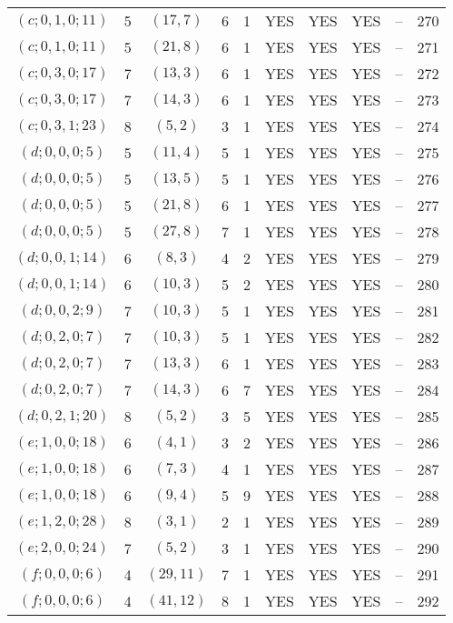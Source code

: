 \begin{longtable}{|c|c|c|c|c|c|c|c|c|c|}
$(c; 0, 1, 0; 11)$ & 5 & $(17, 7)$ & 6 & 1 & YES & YES & YES & -- & 270\\
$(c; 0, 1, 0; 11)$ & 5 & $(21, 8)$ & 6 & 1 & YES & YES & YES & -- & 271\\
$(c; 0, 3, 0; 17)$ & 7 & $(13, 3)$ & 6 & 1 & YES & YES & YES & -- & 272\\
$(c; 0, 3, 0; 17)$ & 7 & $(14, 3)$ & 6 & 1 & YES & YES & YES & -- & 273\\
$(c; 0, 3, 1; 23)$ & 8 & $(5, 2)$ & 3 & 1 & YES & YES & YES & -- & 274\\
$(d; 0, 0, 0; 5)$ & 5 & $(11, 4)$ & 5 & 1 & YES & YES & YES & -- & 275\\
$(d; 0, 0, 0; 5)$ & 5 & $(13, 5)$ & 5 & 1 & YES & YES & YES & -- & 276\\
$(d; 0, 0, 0; 5)$ & 5 & $(21, 8)$ & 6 & 1 & YES & YES & YES & -- & 277\\
$(d; 0, 0, 0; 5)$ & 5 & $(27, 8)$ & 7 & 1 & YES & YES & YES & -- & 278\\
$(d; 0, 0, 1; 14)$ & 6 & $(8, 3)$ & 4 & 2 & YES & YES & YES & -- & 279\\
$(d; 0, 0, 1; 14)$ & 6 & $(10, 3)$ & 5 & 2 & YES & YES & YES & -- & 280\\
$(d; 0, 0, 2; 9)$ & 7 & $(10, 3)$ & 5 & 1 & YES & YES & YES & -- & 281\\
$(d; 0, 2, 0; 7)$ & 7 & $(10, 3)$ & 5 & 1 & YES & YES & YES & -- & 282\\
$(d; 0, 2, 0; 7)$ & 7 & $(13, 3)$ & 6 & 1 & YES & YES & YES & -- & 283\\
$(d; 0, 2, 0; 7)$ & 7 & $(14, 3)$ & 6 & 7 & YES & YES & YES & -- & 284\\
$(d; 0, 2, 1; 20)$ & 8 & $(5, 2)$ & 3 & 5 & YES & YES & YES & -- & 285\\
$(e; 1, 0, 0; 18)$ & 6 & $(4, 1)$ & 3 & 2 & YES & YES & YES & -- & 286\\
$(e; 1, 0, 0; 18)$ & 6 & $(7, 3)$ & 4 & 1 & YES & YES & YES & -- & 287\\
$(e; 1, 0, 0; 18)$ & 6 & $(9, 4)$ & 5 & 9 & YES & YES & YES & -- & 288\\
$(e; 1, 2, 0; 28)$ & 8 & $(3, 1)$ & 2 & 1 & YES & YES & YES & -- & 289\\
$(e; 2, 0, 0; 24)$ & 7 & $(5, 2)$ & 3 & 1 & YES & YES & YES & -- & 290\\
$(f; 0, 0, 0; 6)$ & 4 & $(29, 11)$ & 7 & 1 & YES & YES & YES & -- & 291\\
$(f; 0, 0, 0; 6)$ & 4 & $(41, 12)$ & 8 & 1 & YES & YES & YES & -- & 292\\

\end{longtable}

